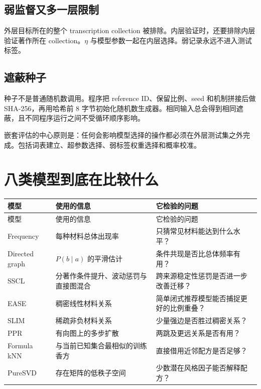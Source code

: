\documentclass[UTF8,11pt,openany,fontset=none]{ctexbook}
\newcommand{\SSCL}{\textsc{SSCL}}
\newenvironment{keybox}{\begin{leftbar}\small\noindent}{\end{leftbar}}
\begin{document}
\section{弱监督又多一层限制}

外层目标所在的整个 transcription collection 被排除。内层验证时，还要排除内层验证著作所在 collection。$\eta$ 与模型参数一起在内层选择。弱记录永远不进入测试标签。

\section{遮蔽种子}

种子不是普通随机数调用。程序把 reference ID、保留比例、seed 和机制拼接后做 SHA-256，再用哈希前 8 字节初始化随机数生成器。相同输入总会得到相同遮蔽，且不同程序运行之间不受循环顺序影响。

\begin{keybox}
嵌套评估的中心原则是：任何会影响模型选择的操作都必须在外层测试集之外完成。包括词表建立、超参数选择、弱标签权重选择和概率校准。
\end{keybox}

\chapter{八类模型到底在比较什么}

\begin{longtable}{p{}p{}p{}}
\toprule
模型 & 使用的信息 & 它检验的问题\\
\midrule
\endfirsthead
\toprule
模型 & 使用的信息 & 它检验的问题\\
\midrule
\endhead
Frequency & 每种材料总体出现率 & 只猜常见材料能达到什么水平？\\
Directed graph & $P(b\mid a)$ 的平滑估计 & 条件共现是否比总体频率有用？\\
\SSCL{} & 分著作条件提升、波动惩罚与直接图混合 & 跨来源稳定性惩罚是否进一步改善迁移？\\
EASE & 稠密线性材料关系 & 简单闭式推荐模型能否捕捉更好的比例重叠？\\
SLIM & 稀疏非负材料关系 & 少量强边是否胜过稠密关系？\\
PPR & 有向图上的多步扩散 & 两跳及更远关系是否有用？\\
Formula kNN & 与当前已知集合最相似的训练香方 & 直接借用近邻配方是否足够？\\
PureSVD & 存在矩阵的低秩子空间 & 少数潜在风格因子能否解释配方？\\
\bottomrule
\end{longtable}
\end{document}
